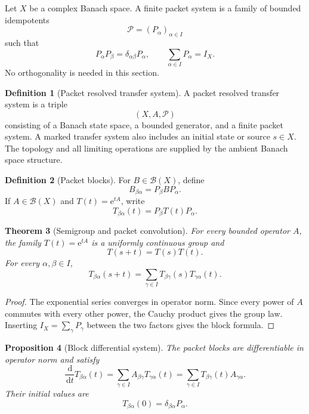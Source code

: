 \documentclass[11pt,a4paper]{article}
\newtheorem{theorem}{Theorem}[section]
\newtheorem{proposition}[theorem]{Proposition}
\theoremstyle{definition}
\newtheorem{definition}[theorem]{Definition}
\theoremstyle{remark}
\newcommand{\Pcal}{\mathcal P}
\newcommand{\e}{\mathrm e}
\newcommand{\dd}{\,\mathrm d}
\begin{document}
Let \(X\) be a complex Banach space. A finite packet system is a family of bounded idempotents
\[
\Pcal=(P_\alpha)_{\alpha\in I}
\]
such that
\[
P_\alpha P_\beta=\delta_{\alpha\beta}P_\alpha,
\qquad
\sum_{\alpha\in I}P_\alpha=I_X.
\]
No orthogonality is needed in this section.

\begin{definition}[Packet resolved transfer system]\label{extended:record:001}
A packet resolved transfer system is a triple
\[
(X,A,\Pcal)
\]
consisting of a Banach state space, a bounded generator, and a finite packet system. A marked transfer system also includes an initial state or source $s\in X$. The topology and all limiting operations are supplied by the ambient Banach space structure.
\end{definition}

\begin{definition}[Packet blocks]\label{extended:record:002}
For \(B\in\mathcal B(X)\), define
\[
B_{\beta\alpha}=P_\beta BP_\alpha.
\]
If \(A\in\mathcal B(X)\) and \(T(t)=\e^{tA}\), write
\[
T_{\beta\alpha}(t)=P_\beta T(t)P_\alpha.
\]
\end{definition}

\begin{theorem}[Semigroup and packet convolution]\label{extended:record:003}\label{extended:thm:packet_convolution}
For every bounded operator \(A\), the family \(T(t)=\e^{tA}\) is a uniformly continuous group and
\[
T(s+t)=T(s)T(t).
\]
For every \(\alpha,\beta\in I\),
\[
T_{\beta\alpha}(s+t)
=
\sum_{\gamma\in I}
T_{\beta\gamma}(s)T_{\gamma\alpha}(t).
\]
\end{theorem}

\begin{proof}
The exponential series converges in operator norm. Since every power of \(A\) commutes with every other power, the Cauchy product gives the group law. Inserting \(I_X=\sum_\gamma P_\gamma\) between the two factors gives the block formula.
\end{proof}

\begin{proposition}[Block differential system]\label{extended:record:004}\label{extended:prop:block_differential}
The packet blocks are differentiable in operator norm and satisfy
\[
\frac{\dd}{\dd t}T_{\beta\alpha}(t)
=
\sum_{\gamma\in I}
A_{\beta\gamma}T_{\gamma\alpha}(t)
=
\sum_{\gamma\in I}
T_{\beta\gamma}(t)A_{\gamma\alpha}.
\]
Their initial values are
\[
T_{\beta\alpha}(0)=\delta_{\beta\alpha}P_\alpha.
\]
\end{proposition}
\end{document}
